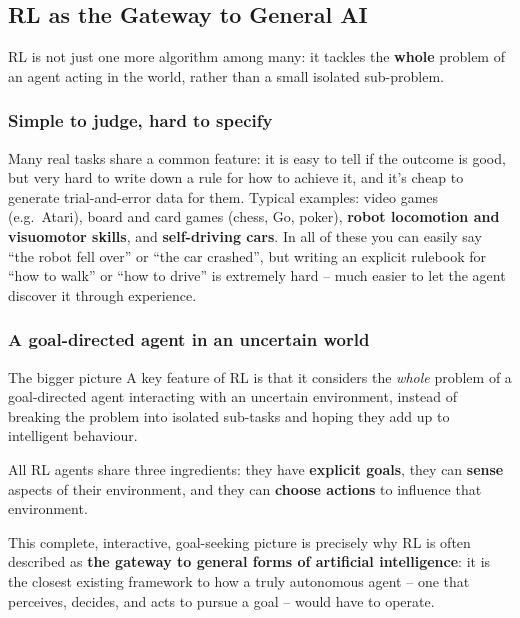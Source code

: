 \subsection{RL as the Gateway to General AI}\label{sec:rl-intro-gateway-general-ai}

RL is not just one more algorithm among many: it tackles the \textbf{whole}
problem of an agent acting in the world, rather than a small isolated
sub-problem.

\subsubsection{Simple to judge, hard to specify}

Many real tasks share a common feature: it is easy to tell if the outcome is good,
but very hard to write down a rule for how to achieve it, and it's cheap to
generate trial-and-error data for them. Typical examples: video games (e.g.\
Atari), board and card games (chess, Go, poker), \textbf{robot locomotion and
visuomotor skills}, and \textbf{self-driving cars}. In all of these you can easily
say ``the robot fell over'' or ``the car crashed'', but writing an explicit
rulebook for ``how to walk'' or ``how to drive'' is extremely hard -- much easier
to let the agent discover it through experience.

\subsubsection{A goal-directed agent in an uncertain world}

\begin{noteboxtitle}{The bigger picture}
A key feature of RL is that it considers the \textit{whole} problem of a
goal-directed agent interacting with an uncertain environment, instead of
breaking the problem into isolated sub-tasks and hoping they add up to
intelligent behaviour.

All RL agents share three ingredients: they have \textbf{explicit goals}, they can
\textbf{sense} aspects of their environment, and they can \textbf{choose actions}
to influence that environment.
\end{noteboxtitle}

This complete, interactive, goal-seeking picture is precisely why RL is often
described as \textbf{the gateway to general forms of artificial intelligence}: it
is the closest existing framework to how a truly autonomous agent -- one that
perceives, decides, and acts to pursue a goal -- would have to operate.

